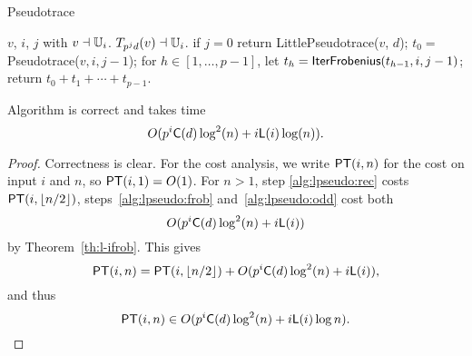 \begin{algorithm}
  \caption{Pseudotrace}
  \begin{algorithmic}[1]
    \REQUIRE $v$, $i$, $j$ with $v\dashv\mathbb{U}_i$.
    \ENSURE $T_{p^jd}(v) \dashv \mathbb{U}_i$.
    \STATE \label{alg:pseudo:base} if $j = 0$ return {\sf LittlePseudotrace}($v$, $d$);
    \STATE \label{alg:pseudo:rec} $t_0=${\sf Pseudotrace}($v, i, j-1$);
    \STATE \label{alg:pseudo:frob}for $h\in [1,\dots,p-1]$, let $t_h=\text{{\sf IterFrobenius}}(t_{h-1}, i, j-1)$;
    \STATE \label{alg:pseudo:sum}return $t_0 + t_1 + \cdots + t_{p-1}$.
  \end{algorithmic}
\end{algorithm}

\begin{theorem}
  \label{th:l-pseudo}
  Algorithm  is correct and takes time
  \begin{equation}
    \label{eq:96}
    O(p^i\mathsf{C}(d)\log^2 (n) + i \mathsf{L}(i)\log (n))
    \text{.}
  \end{equation}
\end{theorem}
\begin{proof}
  Correctness is clear. For the cost analysis, we write $\mathsf{PT}(i,n)$
  for the cost on input $i$ and $n$, so $\mathsf{PT}(i,1)=O(1)$.  For $n>1$,
  step \ref{alg:lpseudo:rec} costs $\mathsf{PT}(i,\lfloor n/2 \rfloor)$,
  steps~\ref{alg:lpseudo:frob} and~\ref{alg:lpseudo:odd} cost both
  \begin{equation}
    \label{eq:100}
    O(p^i\mathsf{C}(d)\log^2 (n) + i \mathsf{L}(i))
  \end{equation}
  by Theorem~\ref{th:l-ifrob}. This gives
  \begin{equation}
    \label{eq:98}
    \mathsf{PT}(i,n) = \mathsf{PT}(i,\lfloor
    n/2\rfloor) +O(p^i\mathsf{C}(d)\log^2 (n) + i \mathsf{L}(i))
    \text{,}
  \end{equation}
  and thus
  \begin{equation}
    \label{eq:99}
    \mathsf{PT}(i,n) \in O(p^i\mathsf{C}(d)\log^2 (n) + i \mathsf{L}(i)\log n)
    \text{.}
  \end{equation}
\end{proof}


